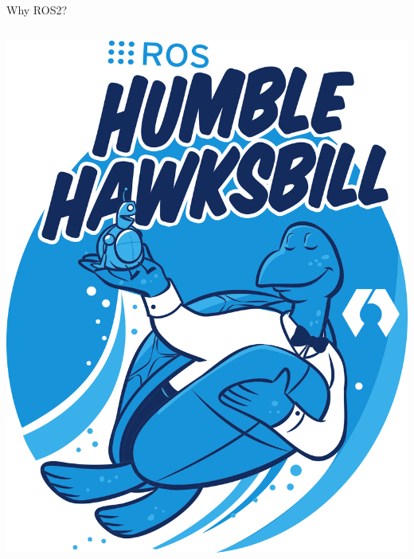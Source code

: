 \begin{frame}{Why ROS2?}
\begin{columns}
\begin{column}{.25\linewidth}
\begin{center}
                \includegraphics[width=\textwidth]{media/ROSHumble.png}
            \end{center}
        \end{column}
    \end{columns}
\end{frame}
